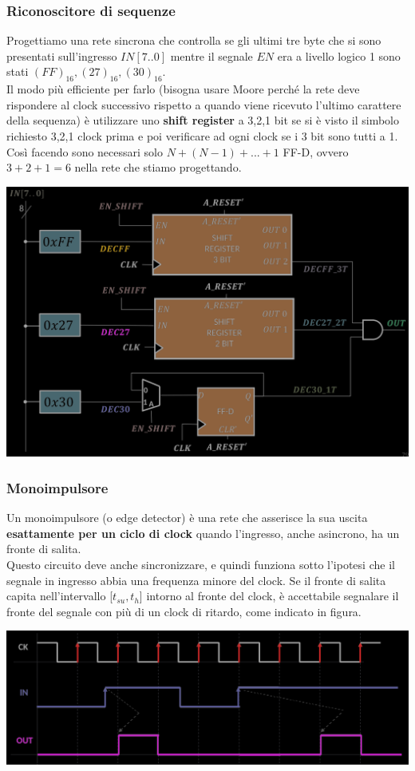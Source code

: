 \documentclass{article}
\begin{document}
\subsubsection{Riconoscitore di sequenze}
Progettiamo una rete sincrona che controlla se gli ultimi tre byte che si sono presentati sull’ingresso $IN[7..0]$ mentre il segnale $EN$ era a livello logico 1 sono stati $(FF)_{16}, (27)_{16}, (30)_{16}$.\\
Il modo più efficiente per farlo (bisogna usare Moore perché la rete deve rispondere al clock successivo rispetto a quando viene ricevuto l’ultimo carattere della sequenza) è utilizzare uno \textbf{shift register} a 3,2,1 bit se si è visto il simbolo richiesto 3,2,1 clock prima e poi verificare ad ogni clock se i 3 bit sono tutti a 1. Così facendo sono necessari solo $N +(N-1) +...+1$ FF-D, ovvero $3+2+1=6$ nella rete che stiamo progettando.
\begin{center}
    \includegraphics[scale=0.35]{ric. sequenze.png}
\end{center}
\subsubsection{Monoimpulsore}
Un monoimpulsore (o edge detector) è una rete che asserisce la sua uscita \textbf{esattamente per un ciclo di clock} quando l’ingresso, anche asincrono, ha un fronte di salita.\\
Questo circuito deve anche sincronizzare, e quindi funziona sotto l’ipotesi che il segnale in ingresso abbia una frequenza minore del clock. Se il fronte di salita capita nell’intervallo [$t_{su},t_h$] intorno al fronte del clock, è accettabile segnalare il fronte del segnale con più di un clock di ritardo, come indicato in figura.
\begin{center}
    \includegraphics[scale=0.35]{monoipulsore grafico.png}
\end{center}
\end{document}
